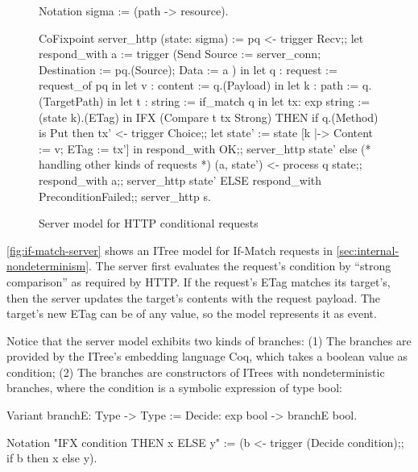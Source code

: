 \begin{figure}
\begin{coq}
  Notation sigma := (path -> resource).

  CoFixpoint server_http (state: sigma) :=
    pq <- trigger Recv;;
    let respond_with a :=
      trigger (Send { Source      := server_conn;
                      Destination := pq.(Source);
                      Data        := a } ) in
    let q : request    := request_of pq    in
    let v : content    := q.(Payload)      in
    let k : path       := q.(TargetPath)   in
    let t : string     := if_match q       in
    let tx: exp string := (state k).(ETag) in
    IFX (Compare t tx Strong)
    THEN
      if q.(Method) is Put
      then
        tx' <- trigger Choice;;
        let state' := state [k |-> {Content := v; ETag := tx'}] in
        respond_with OK;;
        server_http state'
      else                 (* handling other kinds of requests *)
        (a, state') <- process q state;;
        respond_with a;;
        server_http state'
    ELSE
      respond_with PreconditionFailed;;
      server_http s.
\end{coq}
\caption{Server model for HTTP conditional requests}
\label{fig:if-match-server}
\end{figure}

\autoref{fig:if-match-server} shows an ITree model for If-Match requests in
\autoref{sec:internal-nondeterminism}.  The server first evaluates the request's
 condition by ``strong comparison'' as required by HTTP.  If
the request's ETag matches its target's, then the server updates the target's
contents with the request payload.  The target's new ETag  can be of
any value, so the model represents it as  event.

Notice that the server model exhibits two kinds of branches: (1) The 
branches are provided by the ITree's embedding language Coq, which takes a
boolean value as condition; (2) The  branches are constructors of
ITrees with nondeterministic branches, where the condition is a symbolic
expression of type bool:
\begin{coq}
  Variant branchE: Type -> Type :=
    Decide: exp bool -> branchE bool.

  Notation "IFX condition THEN x ELSE y" :=
    (b <- trigger (Decide condition);;
     if b then x else y).
\end{coq}

